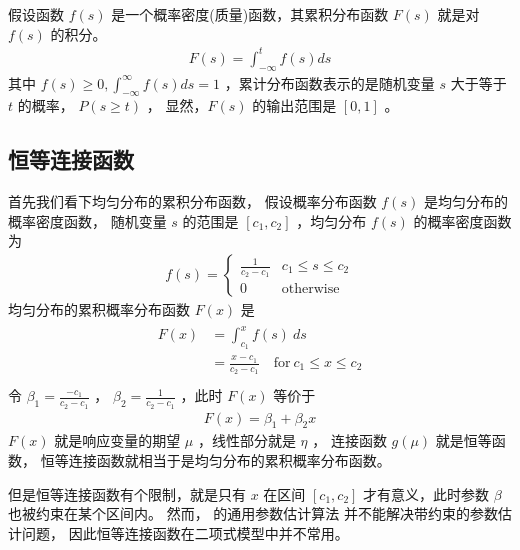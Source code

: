 \documentclass[letterpaper,10pt,english]{sphinxmanual}
\begin{document}
假设函数 \(f(s)\) 是一个概率密度(质量)函数，其累积分布函数 \(F(s)\) 就是对
\(f(s)\) 的积分。
\begin{equation}\label{equation:二项模型/content:二项模型/content:40}
\begin{split}F(s) = \int_{-\infty}^t f(s) ds\end{split}
\end{equation}
其中 \(f(s)\ge0,\int_{-\infty}^{\infty} f(s)ds=1\)
，累计分布函数表示的是随机变量 \(s\) 大于等于 \(t\) 的概率，
\(P(s \ge t)\) ，
显然，\(F(s)\) 的输出范围是 \([0,1]\) 。


\subsection{恒等连接函数}
\label{\detokenize{_u4e8c_u9879_u6a21_u578b/content:id11}}
首先我们看下均匀分布的累积分布函数，
假设概率分布函数 \(f(s)\) 是均匀分布的概率密度函数，
随机变量 \(s\) 的范围是 \([c_1,c_2]\)
，均匀分布 \(f(s)\) 的概率密度函数为
\begin{equation}\label{equation:二项模型/content:二项模型/content:41}
\begin{split}f(s)=
\begin{cases}
\frac{1}{c_2-c_1}& c_1 \le s \le c_2\\
0& \text{otherwise}
\end{cases}\end{split}
\end{equation}
均匀分布的累积概率分布函数 \(F(x)\) 是
\begin{align}\label{equation:二项模型/content:二项模型/content:42}\!\begin{aligned}
F(x) &= \int_{c_1}^x f(s)\ ds\\
&=\frac{x-c_1}{c_2-c_1} \quad \text{for} \ c_1 \le x \le c_2\\
\end{aligned}\end{align}
令 \(\beta_1=\frac{-c_1}{c_2-c_1}\) ，
\(\beta_2=\frac{1}{c_2-c_1}\)
，此时 \(F(x)\) 等价于
\begin{equation}\label{equation:二项模型/content:二项模型/content:43}
\begin{split}F(x) = \beta_1 + \beta_2 x\end{split}
\end{equation}
\(F(x)\) 就是响应变量的期望 \(\mu\)
，线性部分就是 \(\eta\) ，
连接函数 \(g(\mu)\) 就是恒等函数，
恒等连接函数就相当于是均匀分布的累积概率分布函数。

但是恒等连接函数有个限制，就是只有 \(x\) 在区间 \([c_1,c_2]\)
才有意义，此时参数 \(\beta\) 也被约束在某个区间内。
然而， 的通用参数估计算法  并不能解决带约束的参数估计问题，
因此恒等连接函数在二项式模型中并不常用。
\end{document}
